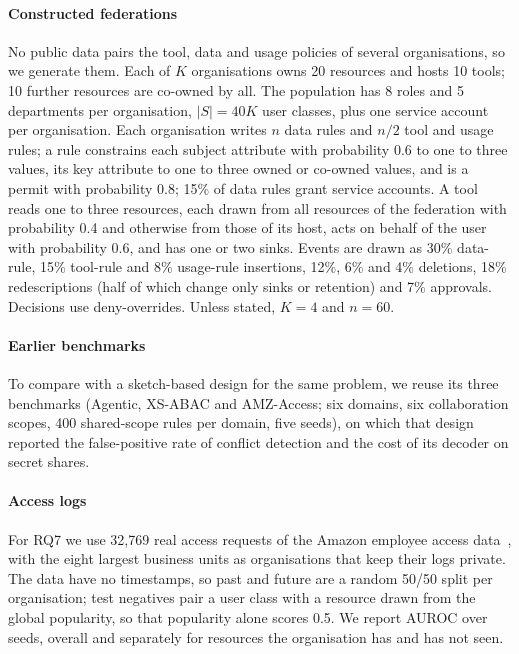 \paragraph{Constructed federations} No public data pairs the tool, data and usage policies of several organisations, so we generate them. Each of $K$ organisations owns 20 resources and hosts 10 tools; 10 further resources are co-owned by all. The population has 8 roles and 5 departments per organisation, $|S| = 40K$ user classes, plus one service account per organisation. Each organisation writes $n$ data rules and $n/2$ tool and usage rules; a rule constrains each subject attribute with probability 0.6 to one to three values, its key attribute to one to three owned or co-owned values, and is a permit with probability 0.8; 15\% of data rules grant service accounts. A tool reads one to three resources, each drawn from all resources of the federation with probability 0.4 and otherwise from those of its host, acts on behalf of the user with probability 0.6, and has one or two sinks. Events are drawn as 30\% data-rule, 15\% tool-rule and 8\% usage-rule insertions, 12\%, 6\% and 4\% deletions, 18\% redescriptions (half of which change only sinks or retention) and 7\% approvals. Decisions use deny-overrides. Unless stated, $K = 4$ and $n = 60$.

\paragraph{Earlier benchmarks} To compare with a sketch-based design for the same problem, we reuse its three benchmarks (Agentic, XS-ABAC and AMZ-Access; six domains, six collaboration scopes, 400 shared-scope rules per domain, five seeds), on which that design reported the false-positive rate of conflict detection and the cost of its decoder on secret shares.

\paragraph{Access logs} For RQ7 we use 32,769 real access requests of the Amazon employee access data~\cite{kaggle2013amazon}, with the eight largest business units as organisations that keep their logs private. The data have no timestamps, so past and future are a random 50/50 split per organisation; test negatives pair a user class with a resource drawn from the global popularity, so that popularity alone scores 0.5. We report AUROC over \rkSeeds{} seeds, overall and separately for resources the organisation has and has not seen.

